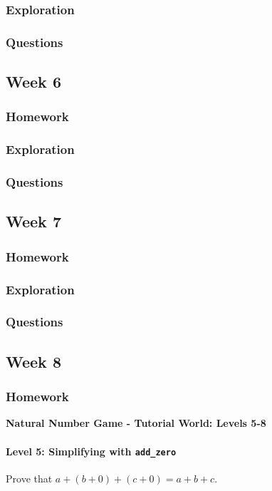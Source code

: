 \documentclass{article}
\theoremstyle{theorem}
\theoremstyle{definition}
\theoremstyle{remark}
\begin{document}
\subsubsection{Exploration}
\subsubsection{Questions}

\subsection{Week 6}
\subsubsection{Homework}
\subsubsection{Exploration}
\subsubsection{Questions}

\subsection{Week 7}
\subsubsection{Homework}
\subsubsection{Exploration}
\subsubsection{Questions}

\subsection{Week 8}
\subsubsection{Homework}

\textbf{Natural Number Game - Tutorial World: Levels 5-8}

\paragraph{Level 5: Simplifying with \texttt{add\_zero}}
Prove that $a + (b + 0) + (c + 0) = a + b + c$.
\end{document}

